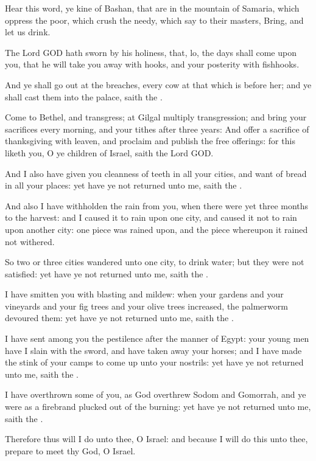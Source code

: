\Chapter
\Verse Hear this word, ye kine of Bashan, that are in the mountain of Samaria, which oppress the poor, which crush the needy, which say to their masters, Bring, and let us drink.

\Verse The Lord GOD hath sworn by his holiness, that, lo, the days shall come upon you, that he will take you away with hooks, and your posterity with fishhooks.

\Verse And ye shall go out at the breaches, every cow at that which is before her; and ye shall cast them into the palace, saith the \LORD.

\Verse Come to Bethel, and transgress; at Gilgal multiply transgression; and bring your sacrifices every morning, and your tithes after three years: \Verse And offer a sacrifice of thanksgiving with leaven, and proclaim and publish the free offerings: for this liketh you, O ye children of Israel, saith the Lord GOD.

\Verse And I also have given you cleanness of teeth in all your cities, and want of bread in all your places: yet have ye not returned unto me, saith the \LORD.

\Verse And also I have withholden the rain from you, when there were yet three months to the harvest: and I caused it to rain upon one city, and caused it not to rain upon another city: one piece was rained upon, and the piece whereupon it rained not withered.

\Verse So two or three cities wandered unto one city, to drink water; but they were not satisfied: yet have ye not returned unto me, saith the \LORD.

\Verse I have smitten you with blasting and mildew: when your gardens and your vineyards and your fig trees and your olive trees increased, the palmerworm devoured them: yet have ye not returned unto me, saith the \LORD.

\Verse I have sent among you the pestilence after the manner of Egypt: your young men have I slain with the sword, and have taken away your horses; and I have made the stink of your camps to come up unto your nostrils: yet have ye not returned unto me, saith the \LORD.

\Verse I have overthrown some of you, as God overthrew Sodom and Gomorrah, and ye were as a firebrand plucked out of the burning: yet have ye not returned unto me, saith the \LORD.

\Verse Therefore thus will I do unto thee, O Israel: and because I will do this unto thee, prepare to meet thy God, O Israel.

